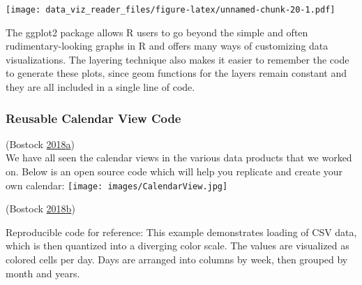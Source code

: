 \documentclass[]{book}
\begin{document}
\texttt{[image: data\_viz\_reader\_files/figure-latex/unnamed-chunk-20-1.pdf]}

The ggplot2 package allows R users to go beyond the simple and often rudimentary-looking graphs in R and offers many ways of customizing data visualizations. The layering technique also makes it easier to remember the code to generate these plots, since geom functions for the layers remain constant and they are all included in a single line of code.

\hypertarget{reusable-calendar-view-code}{%
\subsubsection{Reusable Calendar View Code}\label{reusable-calendar-view-code}}

(Bostock \protect\hyperlink{ref-Calendar_Layout}{2018}\protect\hyperlink{ref-Calendar_Layout}{a})\\
We have all seen the calendar views in the various data products that we worked on. Below is an open source code which will help you replicate and create your own calendar:
\texttt{[image: images/CalendarView.jpg]}

(Bostock \protect\hyperlink{ref-CalendarView}{2018}\protect\hyperlink{ref-CalendarView}{b})

Reproducible code for reference:
This example demonstrates loading of CSV data, which is then quantized into a diverging color scale. The values are visualized as colored cells per day. Days are arranged into columns by week, then grouped by month and years.
\end{document}
